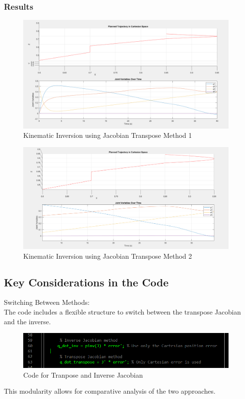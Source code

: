 \documentclass[12pt]{report}
\begin{document}
	\subsubsection{Results}
		\begin{figure}[H]
		\centering
		\includegraphics[scale=0.5]{R1} %
		\caption{Kinematic Inversion using Jacobian Transpose Method 1}
		\label{run10} %
	\end{figure}
	\begin{figure}[H]
		\centering
		\includegraphics[scale=0.5]{D5} %
		\caption{Kinematic Inversion using Jacobian Transpose Method 2}
		\label{run10} %
	\end{figure}
	\subsection{Key Considerations in the Code}
	Switching Between Methods:\\The code includes a flexible structure to switch between the transpose Jacobian and the inverse.
			\begin{figure}[H]
			\centering
			\includegraphics[scale=1.01]{D1} %
			\caption{Code for Tranpose and Inverse Jacobian}
			\label{run10} %
		\end{figure}
		This modularity allows for comparative analysis of the two approaches.
		
\end{document}
